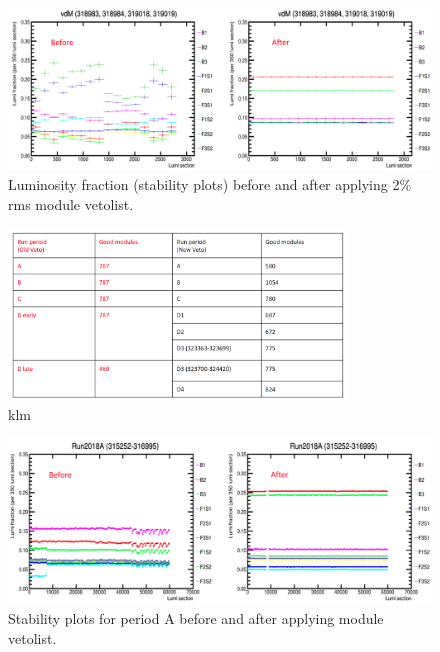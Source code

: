 \begin{figure}[!htp]
\centering
\includegraphics[width=1\textwidth]{ashish_thesis/before_after_vdm_stability.png}
\caption{%
   Luminosity fraction (stability plots) before and after applying 2\% rms module vetolist.
}
\label{fig:b_a_stability_vdm}
\end{figure}


\begin{figure}[!htp]
\centering
\includegraphics[width=0.8\textwidth]{ashish_thesis/old_new_veto.png}
\caption{%
   klm
}
\label{fig:old_new_vetolist}
\end{figure}

\begin{figure}[!htp]
\centering
\includegraphics[width=1\textwidth]{ashish_thesis/2018A_before_after_stability.png}
\caption{%
   Stability plots for period A before and after applying module vetolist.
}
\label{fig:stability_A}
\end{figure}

